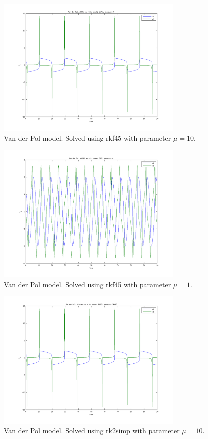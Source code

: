 \begin{figure}[h!]
	\centering
	\includegraphics[width=0.8\textwidth]{img/exc1_45_10}
	\caption{Van der Pol model. Solved using rkf45 with parameter $\mu = 10$.}
	\label{fig:exc1_45_10}
\end{figure}

\begin{figure}[h!]
	\centering
	\includegraphics[width=0.8\textwidth]{img/exc1_45_1}
	\caption{Van der Pol model. Solved using rkf45 with parameter $\mu = 1$.}
	\label{fig:exc1_45_1}
\end{figure}

\begin{figure}[h!]
	\centering
	\includegraphics[width=0.8\textwidth]{img/exc1_2_10}
	\caption{Van der Pol model. Solved using rk2simp with parameter $\mu = 10$.}
	\label{fig:exc1_2_10}
\end{figure}

